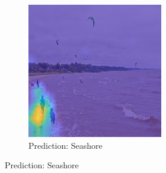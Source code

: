 \begin{figure}
\begin{subfigure}[b]{0.30\textwidth}
         \includegraphics[width=\textwidth]{images/seashore-hm.png}
         \caption{Prediction: Seashore}
         \label{fig:layer-9}
     \end{subfigure}
     

\end{figure}
